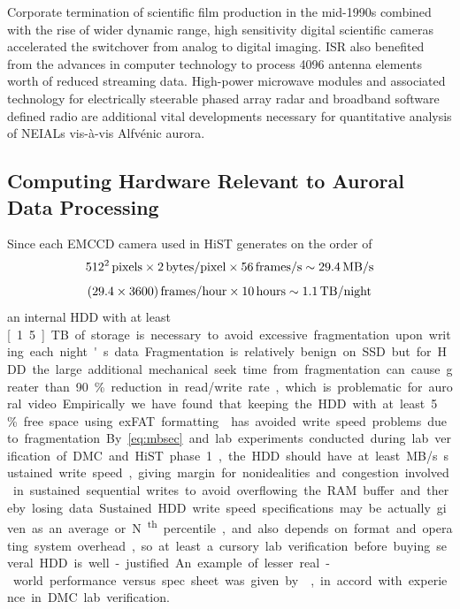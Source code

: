 Corporate termination of scientific film production in the mid-1990s \citep{malin1993} combined with the rise of wider dynamic range, high sensitivity digital scientific cameras accelerated the switchover from analog to digital imaging.
ISR also benefited from the advances in computer technology to process 4096 antenna elements worth of reduced streaming data.
High-power microwave modules and associated technology for electrically steerable phased array radar \citep{valentic2013} and broadband software defined radio \citep{vierinen2016} are additional vital developments necessary for quantitative analysis of NEIALs vis-à-vis Alfvénic aurora.

\subsection{Computing Hardware Relevant to Auroral Data Processing}\label{sec:currentpc}
Since each EMCCD camera used in HiST generates on the order of
\begin{equation}\label{eq:mbsec}
    \unit[512^2]{pixels} \times \unit[2]{bytes/pixel} \times \unit[56]{frames/s} \sim \unit[29.4]{MB/s} 
\end{equation}
\begin{equation}
     \unit[(29.4\times 3600)]{frames/hour} \times \unit[10]{hours} \sim \unit[1.1]{TB/night}
\end{equation}
an internal HDD with at least \unit[1.5]{TB} of storage is necessary to avoid excessive fragmentation upon writing each night's data.
Fragmentation is relatively benign on SSD but for HDD the large additional mechanical seek time from fragmentation can cause greater than 90\% reduction in read/write rate, which is problematic for auroral video.
Empirically we have found that keeping the HDD with at least 5\% free space using exFAT formatting \citep{munegowda2014exfat} has avoided write speed problems due to fragmentation.
By \eqref{eq:mbsec} and lab experiments conducted during lab verification of DMC and HiST phase 1, the HDD should have at least \unit[75]{MB/s} sustained write speed, giving margin for nonidealities and congestion involved in sustained sequential writes to avoid overflowing the RAM buffer and thereby losing data.
Sustained HDD write speed specifications may be actually given as an average or N\textsuperscript{th} percentile, and also depends on format and operating system overhead, so at least a cursory lab verification before buying several HDD is well-justified.
An example of lesser real-world performance versus spec sheet was given by \citet{hddrealworld}, in accord with experience in DMC lab verification.
